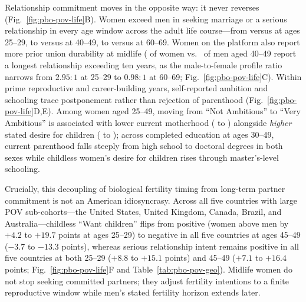 Relationship commitment moves in the opposite way: it never reverses (Fig.~\ref{fig:pbo-pov-life}B). Women exceed men in
seeking marriage or a serious relationship in every age window across the adult life course---from \PboPovSeriousYoungW{}
versus \PboPovSeriousYoungM{} at ages 25--29, to \PboPovSeriousMidW{} versus \PboPovSeriousMidM{} at 40--49, to
\PboPovSeriousSenW{} versus \PboPovSeriousSenM{} at 60--69. Women on the platform also report more prior union durability
at midlife (\PboPovTenYrMidW{} of women vs.\ \PboPovTenYrMidM{} of men aged 40--49 report a longest relationship exceeding
ten years, as the male-to-female profile ratio narrows from $2.95{:}1$ at 25--29 to $0.98{:}1$ at 60--69;
Fig.~\ref{fig:pbo-pov-life}C). Within prime reproductive and career-building years, self-reported ambition and schooling
trace postponement rather than rejection of parenthood (Fig.~\ref{fig:pbo-pov-life}D,E). Among women aged 25--49, moving
from ``Not Ambitious'' to ``Very Ambitious'' is associated with lower current motherhood (\PboPovAmbParentLowW{} to
\PboPovAmbParentHighW) alongside \emph{higher} stated desire for children (\PboPovAmbWantLowW{} to \PboPovAmbWantHighW);
across completed education at ages 30--49, current parenthood falls steeply from high school to doctoral degrees in both
sexes while childless women's desire for children rises through master's-level schooling.

Crucially, this decoupling of biological fertility timing from long-term partner commitment is not an American idiosyncrasy.
Across all five countries with large POV sub-cohorts---the United States, United Kingdom, Canada, Brazil, and
Australia---childless ``Want children'' flips from positive (women above men by $+4.2$ to $+19.7$ points at ages 25--29) to
negative in all five countries at ages 45--49 ($-3.7$ to $-13.3$ points), whereas serious relationship intent remains
positive in all five countries at both 25--29 ($+8.8$ to $+15.1$ points) and 45--49 ($+7.1$ to $+16.4$ points;
Fig.~\ref{fig:pbo-pov-life}F and Table~\ref{tab:pbo-pov-geo}). Midlife women do not stop seeking committed partners; they
adjust fertility intentions to a finite reproductive window while men's stated fertility horizon extends later.

